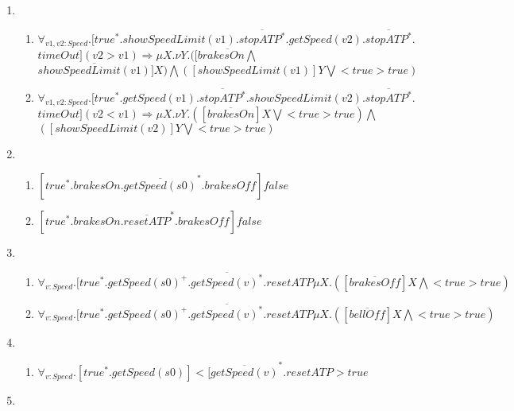 \documentclass[11pt,a4paper]{article}
\begin{document}
\begin{enumerate}
\item
\begin{enumerate}
\item $\forall _{v1,v2 : Speed} . [ true^* . showSpeedLimit(v1) . \overline{stopATP^*} . getSpeed(v2) . \overline{stopATP^*} .$
\\
$ timeOut ] (v2>v1) \Rightarrow  \mu X . \nu Y . ([\overline{brakesOn \bigwedge}$\\
$ \overline{showSpeedLimit(v1)}] X ) \bigwedge ( [showSpeedLimit(v1)] Y \bigvee <true> true)$\\
\item $\forall _{v1,v2: Speed} . [ true^* . getSpeed(v1) .\overline{stopATP^*} . showSpeedLimit(v2) . \overline{stopATP^*} .$\\
$ timeOut ] (v2<v1) \Rightarrow \mu X . \nu Y . ([\overline{brakesOn}] X \bigvee <true> true) \bigwedge$\\ 
$([showSpeedLimit(v2)] Y \bigvee <true> true)$\\
\end{enumerate}
\item
\begin{enumerate}
\item $[true^* . brakesOn . \overline{getSpeed(s0)}^* . brakesOff] false$\\
\item $[true^* . brakesOn . \overline{resetATP}^* . brakesOff] false$\\
\end{enumerate}
\item
\begin{enumerate}
\item $\forall _{v:Speed} . [true^* . getSpeed(s0)^{+}. \overline{getSpeed(v)^*} . resetATP \mu X .([\overline{brakesOff}] X \bigwedge <true> true)$\\
\item $\forall _{v:Speed} . [true^* . getSpeed(s0)^{+} . \overline{getSpeed(v)^*} . resetATP \mu X .([\overline{bellOff}] X \bigwedge <true> true)$\\
\end{enumerate}
\item
\begin{enumerate}
\item $\forall _{v:Speed} .[true^* . getSpeed(s0)]<[\overline{getSpeed(v)}^*.resetATP> true$\\
\end{enumerate}
\item
\begin{enumerate}

\end{enumerate}
\end{enumerate}
\end{document}
